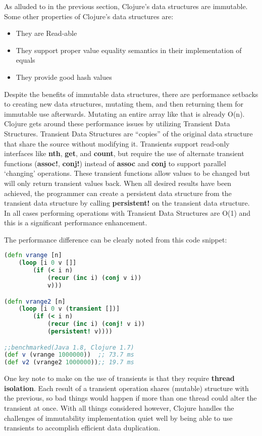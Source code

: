     As alluded to in the previous section, Clojure's data structures are immutable. Some other properties of Clojure's data structures are:
    \begin{itemize}
        \item They are Read-able
        \item They support proper value equality semantics in their implementation of equals
        \item They provide good hash values
    \end{itemize}
    \cite{website:clojure-lang-reference} Despite the benefits of immutable data structures, there are performance setbacks to creating new data structures, mutating them, and then returning them for immutable use afterwards. Mutating an entire array like that is already O(n). Clojure gets around these performance issues by utilizing Transient Data Structures. Transient Data Structures are ``copies'' of the original data structure that share the source without modifying it. Transients support read-only interfaces like \textbf{nth}, \textbf{get}, and \textbf{count}, but require the use of alternate transient functions (\textbf{assoc!}, \textbf{conj!}) instead of \textbf{assoc} and \textbf{conj} to support parallel `changing' operations. These transient functions allow values to be changed but will only return transient values back. When all desired results have been achieved, the programmer can create a persistent data structure from the transient data structure by calling \textbf{persistent!} on the transient data structure. In all cases performing operations with Transient Data Structures are O(1) and this is a significant performance enhancement.

    The performance difference can be clearly noted from this code snippet:
    
    \begin{lstlisting}[language=clojure]
(defn vrange [n]
	(loop [i 0 v []]
		(if (< i n)
			(recur (inc i) (conj v i))
			v)))

(defn vrange2 [n]
	(loop [i 0 v (transient [])]
		(if (< i n)
			(recur (inc i) (conj! v i))
			(persistent! v))))

;;benchmarked(Java 1.8, Clojure 1.7)
(def v (vrange 1000000))  ;; 73.7 ms
(def v2 (vrange2 1000000));; 19.7 ms
	\end{lstlisting}
    
    One key note to make on the use of transients is that they require \textbf{thread isolation}. Each result of a transient operation shares (mutable) structure with the previous, so bad things would happen if more than one thread could alter the transient at once. With all things considered however, Clojure handles the challenges of immutability implementation quiet well by being able to use transients to accomplish efficient data duplication. \cite{clojure_website:reference}
    
